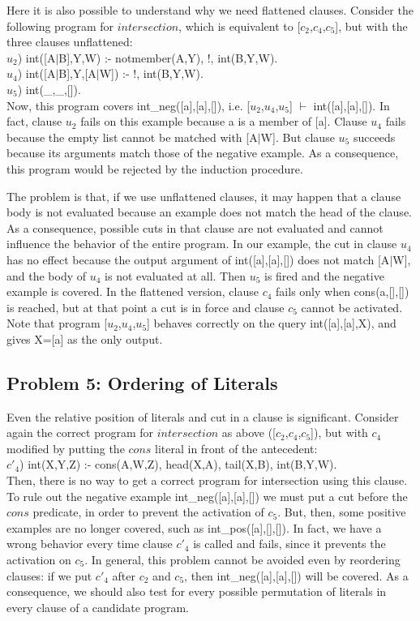Here it is also possible to understand why we need flattened clauses.
Consider the following program for $intersection$, which is 
equivalent to [$c_2$,$c_4$,$c_5$], but with the three clauses
unflattened:\\
 
\noindent
$u_2$) int([A$|$B],Y,W) :- notmember(A,Y), !, int(B,Y,W).\\
$u_4$) int([A$|$B],Y,[A$|$W]) :- !, int(B,Y,W).\\
$u_5$) int(\_,\_,[]).\\
 
\noindent
Now, this program covers int\_neg([a],[a],[]), 
i.e. [$u_2$,$u_4$,$u_5$] $\vdash$ int([a],[a],[]). In fact, clause $u_2$
fails on this example because a is a member of [a]. Clause $u_4$
fails because the empty list cannot be matched with [A$|$W]. But
clause $u_5$ succeeds because its arguments match those of the negative
example. As a consequence, this program would be rejected by the
induction procedure.
 
The problem is that, 
if we use unflattened clauses, it may happen that a clause body is
not evaluated because an example does not match the head
of the clause. As a consequence,
possible cuts in that clause are not evaluated and cannot influence the behavior
of the entire program. In our example, the cut in clause $u_4$ has no
effect because the output argument of int([a],[a],[]) does not match
[A$|$W], and the body of $u_4$ is not evaluated at all. Then $u_5$ is 
fired and the negative example is covered.  In the flattened version, 
clause $c_4$ fails only when cons(a,[],[])
is reached, but at that point a cut
is in force and clause $c_5$ cannot be activated.
Note that program [$u_2$,$u_4$,$u_5$] behaves correctly on the query
int([a],[a],X), and gives X=[a] as the only output.
 
\subsection{Problem 5: Ordering of Literals}
Even the relative position of literals
and cut in a clause is significant. 
Consider again the correct program
for $intersection$ as above ([$c_2$,$c_4$,$c_5$]), 
but with $c_4$ modified by putting the $cons$ literal in front of the
antecedent:\\
 
\noindent
$c'_4$) int(X,Y,Z) :- cons(A,W,Z), head(X,A), tail(X,B), int(B,Y,W).\\
 
\noindent
Then, there is no way to get a correct program for intersection
using this clause. To rule out the negative example
int\_neg([a],[a],[]) we must put a cut before the $cons$ predicate,
in order to prevent the activation of $c_5$. But, then, 
some positive examples are no longer covered, such as int\_pos([a],[],[]).
In fact, we have a wrong behavior every time 
clause $c'_4$ is called and fails,
since it prevents the activation on $c_5$.
In general, this problem cannot be avoided even by reordering clauses:
if we put $c'_4$ after $c_2$ and $c_5$, then int\_neg([a],[a],[])
will be covered.
As a consequence, we should also test for every possible permutation
of literals in every clause of a candidate program.
 
